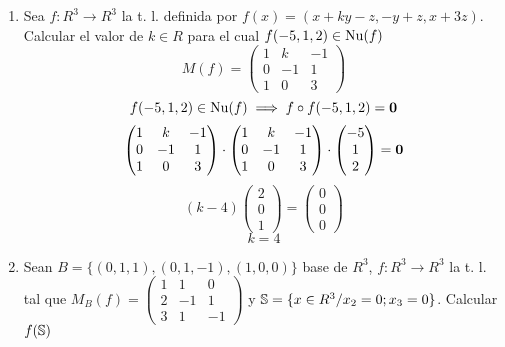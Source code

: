 \documentclass[../practica.root.tex]{subfiles}
\begin{document}
\begin{enumerate}
    \item Sea $f : R^3 \to R^3$ la t. l. definida por $f(x) = (x + ky - z, -y + z, x + 3z)$. Calcular el valor de $k \in R$ para el cual $f(-5,1,2) \in \Nu(f)$
          \[
              M(f) = \begin{pmatrix}
                  1 & k  & -1 \\
                  0 & -1 & 1  \\
                  1 & 0  & 3
              \end{pmatrix}
          \] \[
              f(-5,1,2) \in \Nu(f) \implies f\circ f(-5,1,2) = \0
          \] \[
              \begin{pmatrix}
                  1 & k  & -1 \\
                  0 & -1 & 1  \\
                  1 & 0  & 3
              \end{pmatrix}\cdot\begin{pmatrix}
                  1 & k  & -1 \\
                  0 & -1 & 1  \\
                  1 & 0  & 3
              \end{pmatrix}\cdot\begin{pmatrix}
                  -5 \\ 1 \\ 2
              \end{pmatrix} = \0
          \] \[
              (k-4)
              \begin{pmatrix}
                  2 \\ 0 \\ 1
              \end{pmatrix} = \begin{pmatrix}
                  0 \\ 0 \\ 0
              \end{pmatrix}
          \] \[
              \boxed{k = 4}
          \]

    \item Sean $B = \{(0,1,1),(0,1,-1),(1,0,0)\}$ base de $R^3$, $f : R^3 \to R^3$ la t. l. tal que $M_B(f)=\begin{pmatrix}
                  1 & 1 & 0 \\ 2 & -1 & 1 \\ 3 & 1 & -1
              \end{pmatrix}$ y $\S = \{x \in R^3 / x_2 = 0; x_3 = 0\}$. Calcular $f(\S)$


\end{enumerate}
\end{document}
